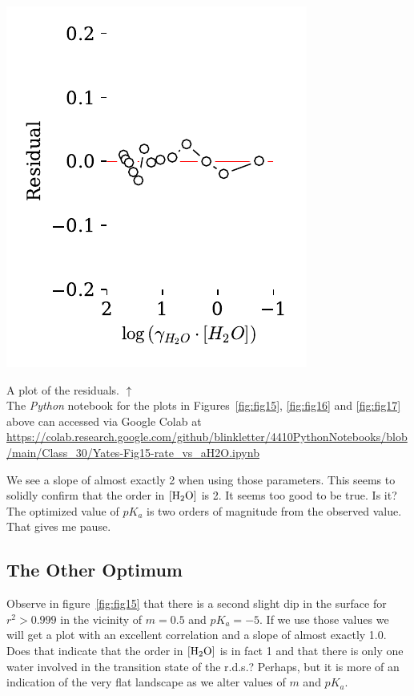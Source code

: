 \documentclass[]{tufte-handout}
\begin{document}
\begin{marginfigure}[45mm]
  \centering
  \includegraphics[scale=0.7]{images/fig16r}
  \caption{A plot of the residuals. $\uparrow$  \\ \vspace{3mm} The \textit{Python} notebook for the plots in Figures~\ref{fig:fig15}, \ref{fig:fig16} and \ref{fig:fig17} above can accessed via Google Colab at \url{https://colab.research.google.com/github/blinkletter/4410PythonNotebooks/blob/main/Class_30/Yates-Fig15-rate_vs_aH2O.ipynb} } 
  \label{fig:fig17}
\end{marginfigure}



We see a slope of almost exactly 2 when using those parameters. This seems to solidly confirm that the order in $[\ce{H2O}]$ is 2. It seems too good to be true. Is it? The optimized value of $pK_a$ is two orders of magnitude from the observed value. That gives me pause.

\subsection{The Other Optimum}

Observe in figure~\ref{fig:fig15} that there is a second slight dip in the surface for $r^2 > 0.999$ in the vicinity of $m = 0.5$ and $pK_a = -5$. If we use those values we will get a plot with an excellent correlation and a slope of almost exactly 1.0. Does that indicate that the order in $[\ce{H2O}]$ is in fact 1 and that there is only one water involved in the transition state of the r.d.s.? Perhaps, but it is more of an indication of the very flat landscape as we alter values of $m$ and $pK_a$.
\end{document}
